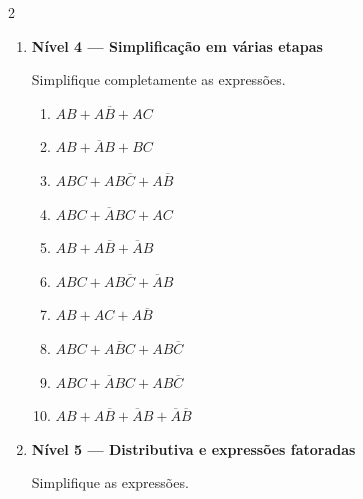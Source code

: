 \documentclass[a4paper,12pt]{article}
\begin{document}
\begin{multicols}{2}
\begin{enumerate}[leftmargin=*]
\begin{enumerate}[label=(\Alph*)]
    \item $A + A(B+C)$

\end{enumerate}

\vspace{0.4cm}


\item \textbf{Nível 4 — Simplificação em várias etapas}

Simplifique completamente as expressões.

\begin{enumerate}[label=(\Alph*)]

    \item $AB + A\overline{B} + AC$

    \item $AB + \overline{A}B + BC$

    \item $ABC + AB\overline{C} + A\overline{B}$

    \item $ABC + \overline{A}BC + AC$

    \item $AB + A\overline{B} + \overline{A}B$

    \item $ABC + AB\overline{C} + \overline{A}B$

    \item $AB + AC + A\overline{B}$

    \item $ABC + A\overline{B}C + AB\overline{C}$

    \item $ABC + \overline{A}BC + AB\overline{C}$

    \item $AB + A\overline{B} + \overline{A}B
    + \overline{A}\overline{B}$

\end{enumerate}

\vspace{0.4cm}


\item \textbf{Nível 5 — Distributiva e expressões fatoradas}

Simplifique as expressões.


\end{enumerate}
\end{multicols}
\end{document}
